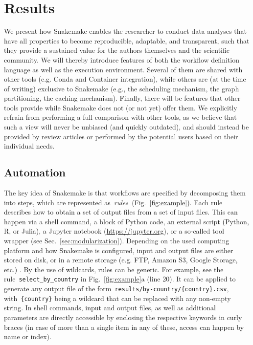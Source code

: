 \documentclass[parskip=half]{scrartcl}
\let\plainurl\url
\renewcommand{\url}[1]{\protect\plainurl{#1}}
\begin{document}
\section{Results}

We present how Snakemake enables the researcher to conduct data analyses that have all properties to become reproducible, adaptable, and transparent, such that they provide a sustained value for the authors themselves and the scientific community.
We will thereby introduce features of both the workflow definition language as well as the execution environment.
Several of them are shared with other tools (e.g. Conda and Container integration), while others are (at the time of writing) exclusive to Snakemake (e.g., the scheduling mechanism, the graph partitioning, the caching mechanism).
Finally, there will be features that other tools provide while Snakemake does not (or not yet) offer them.
We explicitly refrain from performing a full comparison with other tools, as we believe that such a view will never be unbiased (and quickly outdated), and should instead be provided by review articles or performed by the potential users based on their individual needs.

\subsection{Automation}\label{sec:automation}

The key idea of Snakemake is that workflows are specified by decomposing them into steps, which are represented as~\emph{rules~}(Fig.~\ref{fig:example}).
Each rule describes how to obtain a set of output files from a set of input files.
This can happen via a shell command, a block of Python code, an external script (Python, R, or Julia), a Jupyter notebook (\url{https://jupyter.org}), or a so-called tool wrapper (see Sec.~\ref{sec:modularization}).
Depending on the used computing platform and how Snakemake is configured, input and output files are either stored on disk, or in a remote storage (e.g. FTP, Amazon S3, Google Storage, etc.)
.
By the use of wildcards, rules can be generic.
For example, see the rule~\lstinline!select_by_country! in Fig.~\ref{fig:example}a (line 20).
It can be applied to generate any output file of the form~\lstinline!results/by-country/{country}.csv!, with~\lstinline!{country}! being a wildcard that can be replaced with any non-empty string.
In shell commands, input and output files, as well as additional parameters are directly accessible by enclosing the respective keywords in curly braces (in case of more than a single item in any of these, access can happen by name or index).
\end{document}
